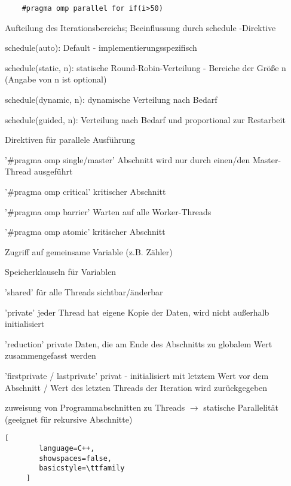 \documentclass[10pt]{article}
\begin{document}
\begin{itemize*}
\begin{itemize*}
\begin{lstlisting}
    #pragma omp parallel for if(i>50)
\end{lstlisting}
  \end{itemize*}
  \item Aufteilung des Iterationsbereichs; Beeinflussung durch schedule -Direktive
  \begin{itemize*}
    \item schedule(auto): Default - implementierungsspezifisch
    \item schedule(static, n): statische Round-Robin-Verteilung - Bereiche der Größe n (Angabe von n ist optional)
    \item schedule(dynamic, n): dynamische Verteilung nach Bedarf
    \item schedule(guided, n): Verteilung nach Bedarf und proportional zur Restarbeit
  \end{itemize*}
  \item Direktiven für parallele Ausführung
  \begin{itemize*}
    \item '\#pragma omp single/master' Abschnitt wird nur durch einen/den Master-Thread ausgeführt
    \item '\#pragma omp critical' kritischer Abschnitt
    \item '\#pragma omp barrier' Warten auf alle Worker-Threads
    \item '\#pragma omp atomic' kritischer Abschnitt \item Zugriff auf gemeinsame Variable (z.B. Zähler)
  \end{itemize*}
  \item Speicherklauseln für Variablen
  \begin{itemize*}
    \item 'shared' für alle Threads sichtbar/änderbar
    \item 'private' jeder Thread hat eigene Kopie der Daten, wird nicht außerhalb initialisiert
    \item 'reduction' private Daten, die am Ende des Abschnitts zu globalem Wert zusammengefasst werden
    \item 'firstprivate / lastprivate' privat - initialisiert mit letztem Wert vor dem Abschnitt / Wert des letzten Threads der Iteration wird zurückgegeben
  \end{itemize*}
  \item zuweisung von Programmabschnitten zu Threads $\rightarrow$ statische Parallelität (geeignet für rekursive Abschnitte)
  \begin{lstlisting}[
        language=C++,
        showspaces=false,
        basicstyle=\ttfamily
     ]

\end{lstlisting}
\end{itemize*}
\end{document}
